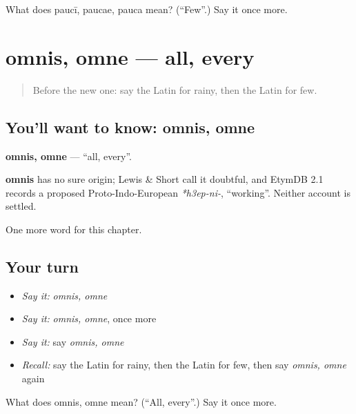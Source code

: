 \begin{tcolorbox}[breakable,colback=teal!4,colframe=teal!35!black,title={Before you move on}]
What does paucī, paucae, pauca mean? (\textquotedblleft{}Few\textquotedblright{}.) Say it once more.
\end{tcolorbox}
\section[omnis, omne]{omnis, omne — all, every}

\label{lesson:LA-C242-omnis}



\begin{quote}
Before the new one: say the Latin for rainy, then the Latin for few.
\end{quote}

\subsection*{You'll want to know: omnis, omne}
\textbf{omnis, omne} — \textquotedblleft{}all, every\textquotedblright{}.

\begin{cousinweb}
\textbf{omnis} has no sure origin; Lewis \& Short call it doubtful, and EtymDB 2.1 records a proposed Proto-Indo-European \emph{*h3ep-ni-}, \textquotedblleft{}working\textquotedblright{}. Neither account is settled.
\end{cousinweb}

\begin{grammarlens}[title={What you've built}]
One more word for this chapter.
\end{grammarlens}

\subsection*{Your turn}
\begin{itemize}
\raggedright
  \item \emph{Say it:} \emph{omnis, omne}
  \item \emph{Say it:} \emph{omnis, omne}, once more
  \item \emph{Say it:} say \emph{omnis, omne}
  \item \emph{Recall:} say the Latin for rainy, then the Latin for few, then say \emph{omnis, omne} again
\end{itemize}

\begin{tcolorbox}[breakable,colback=teal!4,colframe=teal!35!black,title={Before you move on}]
What does omnis, omne mean? (\textquotedblleft{}All, every\textquotedblright{}.) Say it once more.
\end{tcolorbox}
